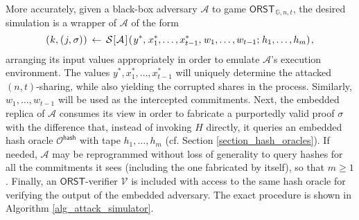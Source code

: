 \documentclass{iacrtrans}
\begin{document}
More accurately, given a black-box adversary $\mathcal{A}$
to game $\mathsf{ORST}_{\hspace{1pt}\mathbb{G}, n, t}$,
the desired simulation is a wrapper of $\mathcal{A}$ of the form
\vspace{5pt}
\begin{equation*}
	(
		\hspace{0.5pt}
		k,
		\hspace{0.5pt}
		(
			\hspace{0.5pt}
			j,
			\hspace{0.5pt}
			\sigma
		)
		\hspace{0.5pt}
	)
	\hspace{2pt}
	\leftarrow
	\hspace{2pt}
	\mathcal{S}
		\hspace{.5pt}
		[
			\hspace{0.5pt}
			\mathcal{A}
			\hspace{1pt}
		]
		\hspace{1pt}
		(
			\hspace{1pt}
			y ^*,
			\hspace{1pt}
			x_1^*, \dots, x_{t-1}^*,
			\hspace{1pt}
			w_1, \dots, w_{t-1};
			\hspace{1pt}
			h_1, \dots, h_m
		)\hspace{1pt},
\vspace{5pt}
\end{equation*}
arranging its input values appropriately
in order to emulate $\mathcal{A}$'s execution environment.
The values $y^*, x_1^*, \dots, x_{t-1}^*$
will uniquely determine the attacked $(n, t)$-sharing,
while also yielding the corrupted shares in the process.
Similarly, $w_1, \dots, w_{t-1}$ will be used
as the intercepted commitments.
Next, the embedded replica of $\mathcal{A}$
consumes its view in order to fabricate
a purportedly valid proof $\sigma$
with the difference that,
instead of invoking $H$ directly,
it queries an embedded hash oracle
$\mathcal{O}^{\mathsf{hash}}$
with tape $h_1, \dots, h_{m}$
(cf. Section \ref{section_hash_oracles}).
If needed, $\mathcal{A}$ may be reprogrammed
without loss of generality
to query hashes for all the commitments it sees
(including the one fabricated by itself),
so that $m \ge 1$.
Finally, an $\mathsf{ORST}$-verifier $\mathcal{V}$
is included with access to the same hash oracle for
verifying the output of the embedded adversary.
The exact procedure is shown in Algorithm \ref{alg_attack_simulator}.
\end{document}
